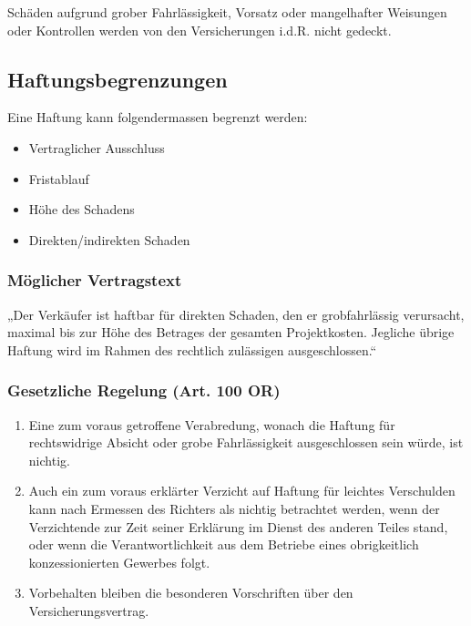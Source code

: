 Schäden aufgrund grober Fahrlässigkeit, Vorsatz oder mangelhafter Weisungen oder
Kontrollen werden von den Versicherungen i.d.R. nicht gedeckt.

\subsection{Haftungsbegrenzungen}
\label{sec:RisikoMgmt-Haftungsbrgrenzungen}
Eine Haftung kann folgendermassen begrenzt werden:
\begin{itemize}
	\tightlist
	\item Vertraglicher Ausschluss
	\item Fristablauf
	\item Höhe des Schadens
	\item Direkten/indirekten Schaden
\end{itemize}

\subsubsection{Möglicher Vertragstext}
„Der Verkäufer ist haftbar für direkten Schaden, den
er grobfahrlässig verursacht, maximal bis zur Höhe
des Betrages der gesamten Projektkosten. Jegliche
übrige Haftung wird im Rahmen des rechtlich
zulässigen ausgeschlossen.“

\subsubsection{Gesetzliche Regelung (Art. 100 OR)}
\begin{enumerate}
	\item Eine zum voraus getroffene Verabredung, wonach die Haftung für
	rechtswidrige Absicht oder grobe Fahrlässigkeit ausgeschlossen sein würde,
	ist nichtig.
	\item Auch ein zum voraus erklärter Verzicht auf Haftung für leichtes Verschulden
	kann nach Ermessen des Richters als nichtig betrachtet werden, wenn der
	Verzichtende zur Zeit seiner Erklärung im Dienst des anderen Teiles stand, oder
	wenn die Verantwortlichkeit aus dem Betriebe eines obrigkeitlich
	konzessionierten Gewerbes folgt.
	\item Vorbehalten bleiben die besonderen Vorschriften über den
	Versicherungsvertrag.
\end{enumerate}

